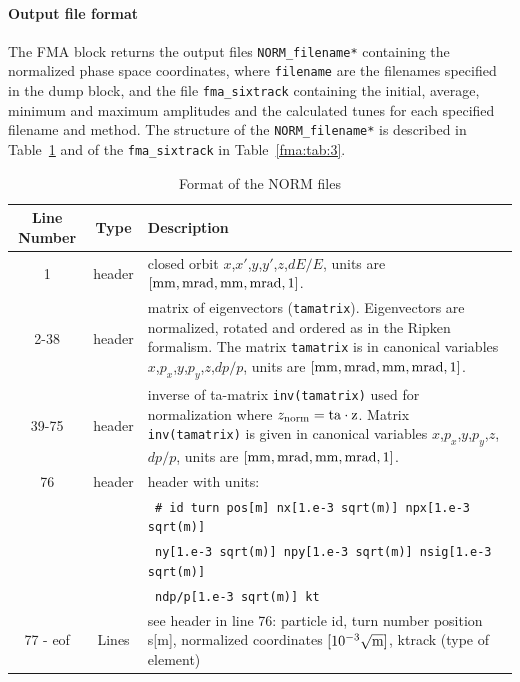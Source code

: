 \paragraph{Output file format}
The FMA block returns the output files \verb|NORM_filename*| containing the normalized phase space coordinates, where \verb|filename| are the filenames specified in the dump block, and the file \verb|fma_sixtrack| containing the initial, average, minimum and maximum amplitudes and the calculated tunes for each specified filename and method. The structure of the \verb|NORM_filename*| is described in Table~\ref{fma:tab:2} and of the \verb|fma_sixtrack| in Table~\ref{fma:tab:3}.
\begin{table}[H]
	\begin{center}
	\caption{Format of the NORM files}\label{fma:tab:2}
	\begin{tabularx}{\textwidth}{|c|c|X|}
		\hline
		{\bf Line Number} & {\bf Type} & {\bf Description} \\
		\hline
		1 & header & closed orbit  $x$,$x'$,$y$,$y'$,$z$,$dE/E$, units are $[\rm mm,mrad,mm,mrad,1]$. \\\hline
		2-38 & header & matrix of eigenvectors (\texttt{tamatrix}). Eigenvectors are normalized, rotated and ordered as in the Ripken formalism. The matrix \texttt{tamatrix} is in canonical variables $x$,$p_x$,$y$,$p_y$,$z$,$dp/p$, units are $[\rm mm,mrad,mm,mrad,1]$. \\\hline
		39-75 & header & inverse of ta-matrix \texttt{inv(tamatrix)} used for normalization where \hbox{$z_{\rm norm}=\rm{ta}\cdot z$}. Matrix \texttt{inv(tamatrix)} is given in canonical variables $x$,$p_x$,$y$,$p_y$,$z$,$dp/p$, units are $[\rm mm,mrad,mm,mrad,1]$.\\\hline
		76 & header & header with units:\\
		& & \verb| # id turn pos[m] nx[1.e-3 sqrt(m)] npx[1.e-3 sqrt(m)]| \\
		& & \quad \verb| ny[1.e-3 sqrt(m)] npy[1.e-3 sqrt(m)] nsig[1.e-3 sqrt(m)] |\\
		& & \quad \verb| ndp/p[1.e-3 sqrt(m)] kt| \\\hline
		77 - eof & Lines & see header in line 76: particle id, turn number position s[m], normalized coordinates $[10^{-3} \sqrt{\rm m}]$, ktrack (type of element)\\\hline
	\end{tabularx}
\end{center}
\end{table}

